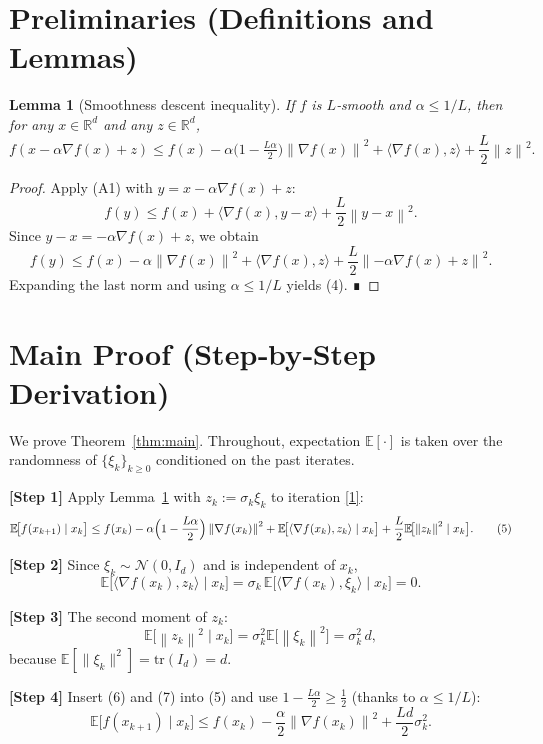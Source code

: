 \documentclass{article}
\newtheorem{lemma}{Lemma}
\newcommand{\E}{\mathbb{E}}
\newcommand{\R}{\mathbb{R}}
\newcommand{\norm}[1]{\left\|#1\right\|}
\newcommand{\ip}[2]{\langle #1,#2\rangle}
\begin{document}
\section*{Preliminaries (Definitions and Lemmas)}
\begin{lemma}[Smoothness descent inequality]
\label{lem:descent}
If $f$ is $L$‑smooth and $\alpha\le1/L$, then for any $x\in\R^{d}$ and any $z\in\R^{d}$,
\[
f(x-\alpha\nabla f(x)+z)\le f(x)-\alpha\bigl(1-\tfrac{L\alpha}{2}\bigr)\norm{\nabla f(x)}^{2}
+\ip{\nabla f(x)}{z}+\frac{L}{2}\norm{z}^{2}.
\tag{4}
\]
\end{lemma}
\begin{proof}
Apply (A1) with $y=x-\alpha\nabla f(x)+z$:
\[
f(y)\le f(x)+\ip{\nabla f(x)}{y-x}+\frac{L}{2}\norm{y-x}^{2}.
\]
Since $y-x=-\alpha\nabla f(x)+z$, we obtain
\[
f(y)\le f(x)-\alpha\norm{\nabla f(x)}^{2}
+\ip{\nabla f(x)}{z}
+\frac{L}{2}\norm{-\alpha\nabla f(x)+z}^{2}.
\]
Expanding the last norm and using $\alpha\le1/L$ yields (4). ∎
\end{proof}

\section*{Main Proof (Step‑by‑Step Derivation)}
We prove Theorem~\ref{thm:main}. Throughout, expectation $\E[\cdot]$ is taken over the randomness of $\{\xi_{k}\}_{k\ge0}$ conditioned on the past iterates.

\bigskip
\noindent\textbf{[Step 1]} Apply Lemma~\ref{lem:descent} with $z_{k}:=\sigma_{k}\xi_{k}$ to iteration \eqref{1}:
\[
\E\!\bigl[f(x_{k+1})\mid x_{k}\bigr]\le 
f(x_{k})-\alpha\Bigl(1-\frac{L\alpha}{2}\Bigr)\norm{\nabla f(x_{k})}^{2}
+\E\!\bigl[\ip{\nabla f(x_{k})}{z_{k}}\mid x_{k}\bigr]
+\frac{L}{2}\E\!\bigl[\norm{z_{k}}^{2}\mid x_{k}\bigr].
\tag{5}
\]

\noindent\textbf{[Step 2]} Since $\xi_{k}\sim\mathcal N(0,I_{d})$ and is independent of $x_{k}$,
\[
\E\!\bigl[\ip{\nabla f(x_{k})}{z_{k}}\mid x_{k}\bigr]
= \sigma_{k}\,\E\!\bigl[\ip{\nabla f(x_{k})}{\xi_{k}}\mid x_{k}\bigr]=0.
\tag{6}
\]

\noindent\textbf{[Step 3]} The second moment of $z_{k}$:
\[
\E\!\bigl[\norm{z_{k}}^{2}\mid x_{k}\bigr]
=\sigma_{k}^{2}\E\!\bigl[\norm{\xi_{k}}^{2}\bigr]
= \sigma_{k}^{2}\,d,
\tag{7}
\]
because $\E[\|\xi_{k}\|^{2}]=\mathrm{tr}(I_{d})=d$.

\noindent\textbf{[Step 4]} Insert (6) and (7) into (5) and use $1-\frac{L\alpha}{2}\ge\frac{1}{2}$ (thanks to $\alpha\le1/L$):
\[
\E\!\bigl[f(x_{k+1})\mid x_{k}\bigr]\le 
f(x_{k})-\frac{\alpha}{2}\norm{\nabla f(x_{k})}^{2}
+\frac{L d}{2}\sigma_{k}^{2}.
\tag{8}
\]
\end{document}

